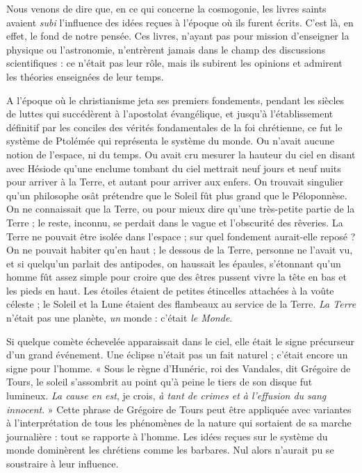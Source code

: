\documentclass[a4paper, 11pt, oneside, landscape]{article}
\begin{document}
Nous venons de dire que, en ce qui concerne la cosmogonie, les livres saints avaient \emph{subi} l'influence des idées reçues à l'époque où ils furent écrits. C'est là, en effet, le fond de notre pensée. Ces livres, n'ayant pas pour mission d'enseigner la physique ou l'astronomie, n'entrèrent jamais dans le champ des discussions scientifiques : ce n'était pas leur rôle, mais ils subirent les opinions et admirent les théories enseignées de leur temps.

A l'époque où le christianisme jeta ses premiers fondements, pendant les siècles de luttes qui succédèrent à l'apostolat évangélique, et jusqu'à l'établissement définitif par les conciles des vérités fondamentales de la foi chrétienne, ce fut le système de Ptolémée qui représenta le système du monde. Ou n'avait aucune notion de l'espace, ni du temps. Ou avait cru mesurer la hauteur du ciel en disant avec Hésiode qu'une enclume tombant du ciel mettrait neuf jours et neuf nuits pour arriver à la Terre, et autant pour arriver aux enfers. On trouvait singulier qu'un philosophe osât prétendre que le Soleil fût plus grand que le Péloponnèse. On ne connaissait que la Terre, ou pour mieux dire qu'une très-petite partie de la Terre ; le reste, inconnu, se perdait dans le vague et l'obscurité des rêveries. La Terre ne pouvait être isolée dans l'espace ; sur quel fondement aurait-elle reposé ? On ne pouvait habiter qu'en haut ; le dessous de la Terre, personne ne l'avait vu, et si quelqu'un parlait des antipodes, on haussait les épaules, s'étonnant qu'un homme fût assez simple pour croire que des êtres pussent vivre la tête en bas et les pieds en haut. Les étoiles étaient de petites étincelles attachées à la voûte céleste ; le Soleil et la Lune étaient des flambeaux au service de la Terre. \emph{La Terre} n'était pas une planète, \emph{un} monde : c'était \emph{le Monde}.

Si quelque comète échevelée apparaissait dans le ciel, elle était le signe précurseur d'un grand événement. Une éclipse n'était pas un fait naturel ; c'était encore un signe pour l'homme. « Sous le règne d'Hunéric, roi des Vandales, dit Grégoire de Tours, le soleil s'assombrit au point qu'à peine le tiers de son disque fut lumineux. \emph{La cause en est}, je crois, \emph{à tant de crimes et à l'effusion du sang innocent}. » Cette phrase de Grégoire de Tours peut être appliquée avec variantes à l'interprétation de tous les phénomènes de la nature qui sortaient de sa marche journalière : tout se rapporte à l'homme. Les idées reçues sur le système du monde dominèrent les chrétiens comme les barbares. Nul alors n'aurait pu se soustraire à leur influence.
\end{document}

